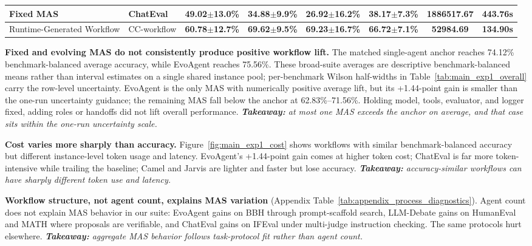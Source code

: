 \begin{table}[!t]
{\begin{tabular}{l l cccccc}
            Fixed MAS                  & ChatEval        & 49.02{\scriptsize $\pm$13.0}\%          & 34.88{\scriptsize $\pm$9.9}\%          & 26.92{\scriptsize $\pm$16.2}\%          & 38.17{\scriptsize $\pm$7.3}\%          & 1886517.67        & 443.76s          \\
            \midrule
            Runtime-Generated Workflow & CC-workflow     & \textbf{60.78{\scriptsize $\pm$12.7}\%} & \textbf{69.62{\scriptsize $\pm$9.5}\%} & \textbf{69.23{\scriptsize $\pm$16.7}\%} & \textbf{66.72{\scriptsize $\pm$7.1}\%} & \textbf{52984.69} & \textbf{134.90s} \\
            \bottomrule
        \end{tabular}
    }
    \renewcommand{\arraystretch}{1.0}
\end{table}

\noindent\textbf{Fixed and evolving MAS do not consistently produce positive workflow lift.} The matched single-agent anchor reaches 74.12\% benchmark-balanced average accuracy, while EvoAgent reaches 75.56\%. These broad-suite averages are descriptive benchmark-balanced means rather than interval estimates on a single shared instance pool; per-benchmark Wilson half-widths in Table~\ref{tab:main_exp1_overall} carry the row-level uncertainty. EvoAgent is the only MAS with numerically positive average lift, but its +1.44-point gain is smaller than the one-run uncertainty guidance; the remaining MAS fall below the anchor at 62.83\%--71.56\%. Holding model, tools, evaluator, and logger fixed, adding roles or handoffs did not lift overall performance. \emph{\textbf{Takeaway:} at most one MAS exceeds the anchor on average, and that case sits within the one-run uncertainty scale.}

\noindent\textbf{Cost varies more sharply than accuracy.} Figure~\ref{fig:main_exp1_cost} shows workflows with similar benchmark-balanced accuracy but different instance-level token usage and latency. EvoAgent's +1.44-point gain comes at higher token cost; ChatEval is far more token-intensive while trailing the baseline; Camel and Jarvis are lighter and faster but lose accuracy. \emph{\textbf{Takeaway:} accuracy-similar workflows can have sharply different token use and latency.}

\noindent\textbf{Workflow structure, not agent count, explains MAS variation} (Appendix Table~\ref{tab:appendix_process_diagnostics}). Agent count does not explain MAS behavior in our suite: EvoAgent gains on BBH through prompt-scaffold search, LLM-Debate gains on HumanEval and MATH where proposals are verifiable, and ChatEval gains on IFEval under multi-judge instruction checking. The same protocols hurt elsewhere. \emph{\textbf{Takeaway:} aggregate MAS behavior follows task-protocol fit rather than agent count.}

